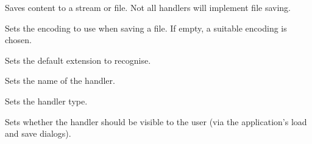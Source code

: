 
Saves content to a stream or file. Not all handlers will implement file saving.

\label{wxrichtextfilehandlersetencoding}


Sets the encoding to use when saving a file. If empty, a suitable encoding is chosen.

\label{wxrichtextfilehandlersetextension}


Sets the default extension to recognise.

\label{wxrichtextfilehandlersetname}


Sets the name of the handler.

\label{wxrichtextfilehandlersettype}


Sets the handler type.

\label{wxrichtextfilehandlersetvisible}


Sets whether the handler should be visible to the user (via the application's load and save
dialogs).
